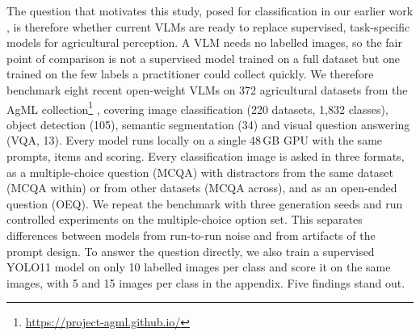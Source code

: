 \documentclass[10pt,letterpaper]{article}
\newcommand{\agmlurl}{\url{https://project-agml.github.io/}}
\begin{document}
The question that motivates this study, posed for classification in our earlier work \cite{ranario_are_2025}, is therefore whether current VLMs are ready to replace supervised, task-specific models for agricultural perception. A VLM needs no labelled images, so the fair point of comparison is not a supervised model trained on a full dataset but one trained on the few labels a practitioner could collect quickly. We therefore benchmark eight recent open-weight VLMs on 372 agricultural datasets from the AgML collection\footnote{\agmlurl} \cite{joshi_standardizing_2023}, covering image classification (220 datasets, 1,832 classes), object detection (105), semantic segmentation (34) and visual question answering (VQA, 13). Every model runs locally on a single 48\,GB GPU with the same prompts, items and scoring. Every classification image is asked in three formats, as a multiple-choice question (MCQA) with distractors from the same dataset (MCQA within) or from other datasets (MCQA across), and as an open-ended question (OEQ). We repeat the benchmark with three generation seeds and run controlled experiments on the multiple-choice option set. This separates differences between models from run-to-run noise and from artifacts of the prompt design. To answer the question directly, we also train a supervised YOLO11 model on only 10 labelled images per class and score it on the same images, with 5 and 15 images per class in the appendix. Five findings stand out.
\end{document}

